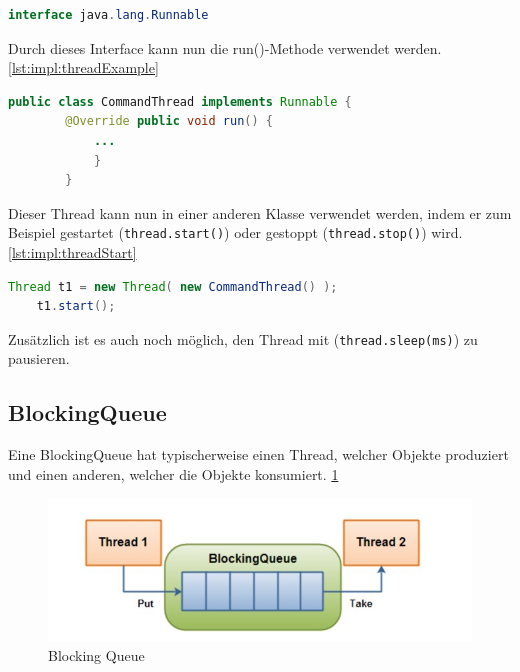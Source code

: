 \begin{lstlisting}[language=java,caption=Java Runnable,label=lst:impl:javaRunnable]
    interface java.lang.Runnable
\end{lstlisting}
 
Durch dieses Interface kann nun die run()-Methode verwendet werden. \ref{lst:impl:threadExample}
 
\begin{lstlisting}[language=java,caption=Einfaches Thread Beispiel,label=lst:impl:threadExample]
    public class CommandThread implements Runnable { 
        @Override public void run() {   
            ...
            }
        }
\end{lstlisting}
 
Dieser Thread kann nun in einer anderen Klasse verwendet werden, indem er zum Beispiel gestartet (\texttt{thread.start()}) oder gestoppt (\texttt{thread.stop()}) wird. \ref{lst:impl:threadStart}
 
\begin{lstlisting}[language=java,caption=Thread erstellen/starten,label=lst:impl:threadStart]
    Thread t1 = new Thread( new CommandThread() );
    t1.start();
\end{lstlisting}
 
Zusätzlich ist es auch noch möglich, den Thread mit (\texttt{thread.sleep(ms)}) zu pausieren. \cite{javaInselBuch}

\subsection{BlockingQueue}
 
Eine BlockingQueue hat typischerweise einen Thread, welcher Objekte produziert und einen anderen, welcher die Objekte konsumiert. \ref{fig:impl:BlockingQueue}
 
\begin{figure}[h t]
    \centering
    \includegraphics[scale=0.5]{pics/blockingQueue.jpg}
    \caption{Blocking Queue \cite{javaBlockingQueue}}
    \label{fig:impl:BlockingQueue}
\end{figure}
 
